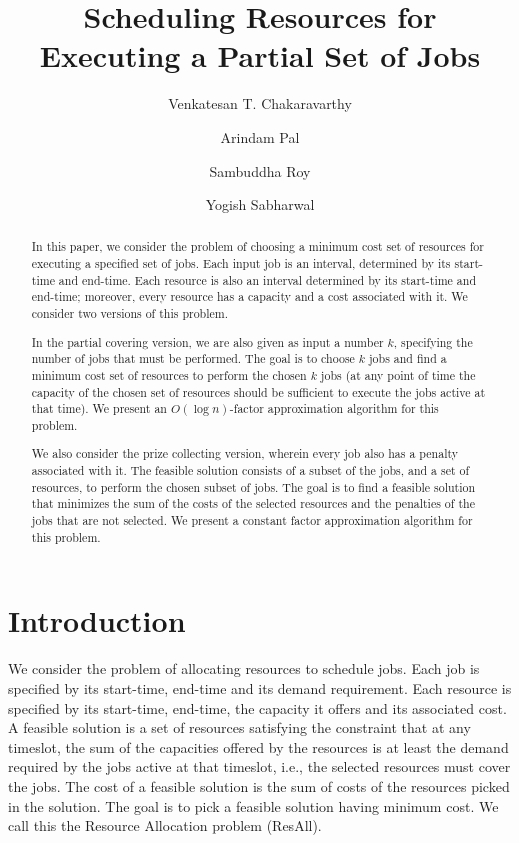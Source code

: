 \documentclass[11pt]{article}
\title{Scheduling Resources for Executing a Partial Set of Jobs}
\author[1]{Venkatesan T. Chakaravarthy}
\author[2]{Arindam Pal}
\author[1]{Sambuddha Roy}
\author[1]{Yogish Sabharwal}
\affil[1]{IBM Research Lab, New Delhi, India\\
  \texttt{\{vechakra,sambuddha,ysabharwal\}@in.ibm.com}
}
\affil[2]{Indian Institute of Technology, New Delhi.\\
\texttt{arindamp@cse.iitd.ernet.in}
}
\newcommand{\ResAll} {{\sc ResAll}}
\begin{document}
\maketitle

\begin{abstract}
In this paper, we consider the problem of choosing a minimum cost set of resources for executing
 a specified set of jobs. 
 Each input job is an interval, determined by its start-time and end-time. Each resource is also an interval determined by its start-time and end-time; moreover, every resource has a capacity and a cost associated with it. 
We consider two versions of this problem. 

In the partial covering version, 
we are also given as input a number $k$, specifying the number of jobs that must be performed. The goal is to choose $k$ jobs and find a minimum cost set of resources to perform the chosen $k$ jobs (at any point of time the capacity of the chosen set of resources should be sufficient to execute the jobs active at that time). We present an $O(\log n)$-factor approximation algorithm for this problem. 

We also consider the prize collecting version, wherein every job also has a penalty 
associated with it. The feasible solution consists of a subset of the jobs, and a set of resources, 
to perform the chosen subset of jobs. The goal is to find a feasible solution that minimizes the 
sum of the costs of the selected resources and the penalties of the jobs that are not selected. 
We present a constant factor approximation algorithm for this problem.
\end{abstract}

\section{Introduction}
\label{sec:intro}
We consider the problem of allocating resources to schedule jobs. 
Each job is specified by its start-time, end-time and its demand requirement.
Each resource is specified by its start-time, end-time, the capacity it offers and its associated cost. 
A feasible solution is a set of resources satisfying the constraint that at any timeslot, 
the sum of the capacities offered by the resources is at least the demand required by
the jobs active at that timeslot, i.e., the selected resources must cover the jobs.
The cost of a feasible solution is the sum of costs of the resources picked in the solution.
The goal is to pick a feasible solution having minimum cost.
We call this the Resource Allocation problem ({\ResAll}).
\end{document}
